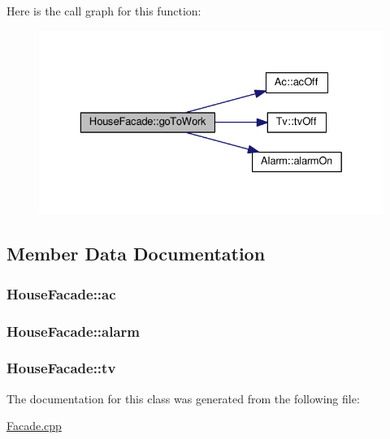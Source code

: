 Here is the call graph for this function\+:
\nopagebreak
\begin{figure}[H]
\begin{center}
\leavevmode
\includegraphics[width=329pt]{classHouseFacade_af62723fc617325d0ea4918349cb66dbb_cgraph}
\end{center}
\end{figure}




\subsection{Member Data Documentation}
\subsubsection[{\texorpdfstring{ac}{ac}}]{ House\+Facade\+::ac\hspace{0.3cm}{\ttfamily [private]}}\hypertarget{classHouseFacade_a6d30f8878c9f220d37f5866084466d35}{}\label{classHouseFacade_a6d30f8878c9f220d37f5866084466d35}
\subsubsection[{\texorpdfstring{alarm}{alarm}}]{ House\+Facade\+::alarm\hspace{0.3cm}{\ttfamily [private]}}\hypertarget{classHouseFacade_a9635b0a634d8fc7be556c9dd33782cb9}{}\label{classHouseFacade_a9635b0a634d8fc7be556c9dd33782cb9}
\subsubsection[{\texorpdfstring{tv}{tv}}]{ House\+Facade\+::tv\hspace{0.3cm}{\ttfamily [private]}}\hypertarget{classHouseFacade_a58d2375afc4bed9ae74bd18cf4dd79ef}{}\label{classHouseFacade_a58d2375afc4bed9ae74bd18cf4dd79ef}


The documentation for this class was generated from the following file\+:\begin{DoxyCompactItemize}
\item 
\hyperlink{Facade_8cpp}{Facade.\+cpp}\end{DoxyCompactItemize}
